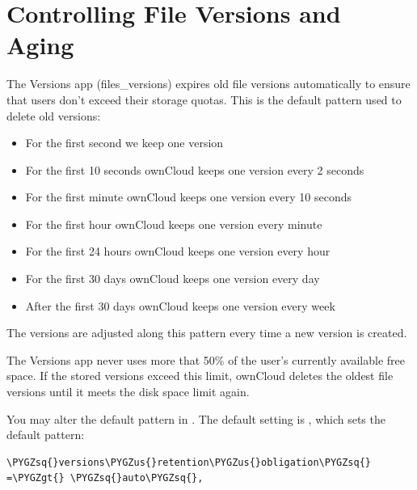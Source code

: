 \documentclass[letterpaper,10pt,english]{sphinxmanual}
\def\PYGZus{\char`\_}
\def\PYGZgt{\char`\>}
\def\PYGZsq{\char`\'}
\renewcommand\PYGZsq{\textquotesingle}
\begin{document}
\section{Controlling File Versions and Aging}
\label{configuration_files/file_versioning:controlling-file-versions-and-aging}\label{configuration_files/file_versioning::doc}
The Versions app (files\_versions) expires old file versions automatically to
ensure that users don't exceed their storage quotas. This is the default
pattern used to delete old versions:
\begin{itemize}
\item {} 
For the first second we keep one version

\item {} 
For the first 10 seconds ownCloud keeps one version every 2 seconds

\item {} 
For the first minute ownCloud keeps one version every 10 seconds

\item {} 
For the first hour ownCloud keeps one version every minute

\item {} 
For the first 24 hours ownCloud keeps one version every hour

\item {} 
For the first 30 days ownCloud keeps one version every day

\item {} 
After the first 30 days ownCloud keeps one version every week

\end{itemize}

The versions are adjusted along this pattern every time a new version is
created.

The Versions app never uses more that 50\% of the user's currently available
free space. If the stored versions exceed this limit, ownCloud deletes the
oldest file versions until it meets the disk space limit again.

You may alter the default pattern in . The default setting is
, which sets the default pattern:

\begin{Verbatim}[commandchars=\\\{\}]
\PYGZsq{}versions\PYGZus{}retention\PYGZus{}obligation\PYGZsq{} =\PYGZgt{} \PYGZsq{}auto\PYGZsq{},
\end{Verbatim}
\end{document}
